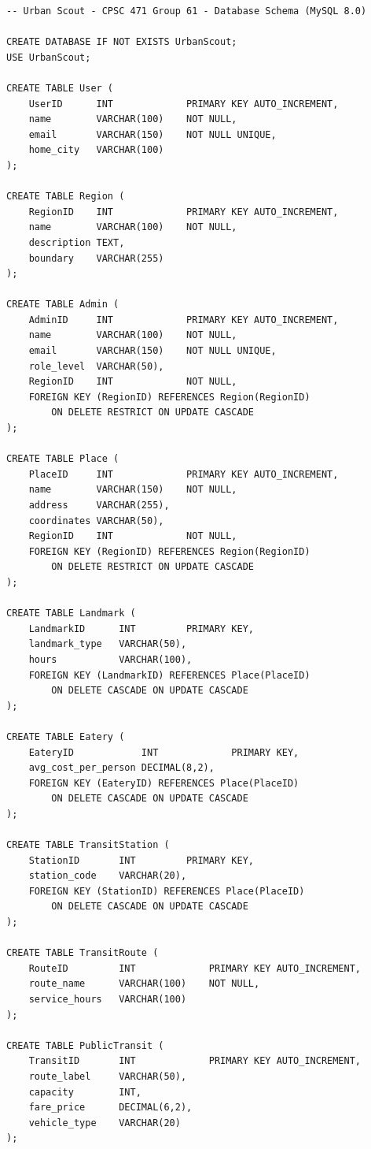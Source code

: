 \begin{lstlisting}[language=MySQL,caption={Full database schema (DDL).},label={lst:ddl}]
-- Urban Scout - CPSC 471 Group 61 - Database Schema (MySQL 8.0)

CREATE DATABASE IF NOT EXISTS UrbanScout;
USE UrbanScout;

CREATE TABLE User (
    UserID      INT             PRIMARY KEY AUTO_INCREMENT,
    name        VARCHAR(100)    NOT NULL,
    email       VARCHAR(150)    NOT NULL UNIQUE,
    home_city   VARCHAR(100)
);

CREATE TABLE Region (
    RegionID    INT             PRIMARY KEY AUTO_INCREMENT,
    name        VARCHAR(100)    NOT NULL,
    description TEXT,
    boundary    VARCHAR(255)
);

CREATE TABLE Admin (
    AdminID     INT             PRIMARY KEY AUTO_INCREMENT,
    name        VARCHAR(100)    NOT NULL,
    email       VARCHAR(150)    NOT NULL UNIQUE,
    role_level  VARCHAR(50),
    RegionID    INT             NOT NULL,
    FOREIGN KEY (RegionID) REFERENCES Region(RegionID)
        ON DELETE RESTRICT ON UPDATE CASCADE
);

CREATE TABLE Place (
    PlaceID     INT             PRIMARY KEY AUTO_INCREMENT,
    name        VARCHAR(150)    NOT NULL,
    address     VARCHAR(255),
    coordinates VARCHAR(50),
    RegionID    INT             NOT NULL,
    FOREIGN KEY (RegionID) REFERENCES Region(RegionID)
        ON DELETE RESTRICT ON UPDATE CASCADE
);

CREATE TABLE Landmark (
    LandmarkID      INT         PRIMARY KEY,
    landmark_type   VARCHAR(50),
    hours           VARCHAR(100),
    FOREIGN KEY (LandmarkID) REFERENCES Place(PlaceID)
        ON DELETE CASCADE ON UPDATE CASCADE
);

CREATE TABLE Eatery (
    EateryID            INT             PRIMARY KEY,
    avg_cost_per_person DECIMAL(8,2),
    FOREIGN KEY (EateryID) REFERENCES Place(PlaceID)
        ON DELETE CASCADE ON UPDATE CASCADE
);

CREATE TABLE TransitStation (
    StationID       INT         PRIMARY KEY,
    station_code    VARCHAR(20),
    FOREIGN KEY (StationID) REFERENCES Place(PlaceID)
        ON DELETE CASCADE ON UPDATE CASCADE
);

CREATE TABLE TransitRoute (
    RouteID         INT             PRIMARY KEY AUTO_INCREMENT,
    route_name      VARCHAR(100)    NOT NULL,
    service_hours   VARCHAR(100)
);

CREATE TABLE PublicTransit (
    TransitID       INT             PRIMARY KEY AUTO_INCREMENT,
    route_label     VARCHAR(50),
    capacity        INT,
    fare_price      DECIMAL(6,2),
    vehicle_type    VARCHAR(20)
);


\end{lstlisting}
